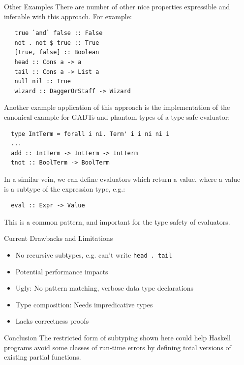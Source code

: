 \documentclass[final]{beamer}
\begin{document}
\begin{frame}[fragile]
\begin{columns}
\begin{column}{.33\textwidth}
\end{column}

\begin{column}{.285\textwidth}
\begin{block}{Other Examples}
\vspace{0.5cm}
There are number of other nice properties expressible and inferable with this
approach. For example:

\begin{verbatim}
   true `and` false :: False
   not . not $ true :: True
   [true, false] :: Boolean
   head :: Cons a -> a
   tail :: Cons a -> List a
   null nil :: True
   wizard :: DaggerOrStaff -> Wizard
\end{verbatim}

Another example application of this approach is the implementation of the
canonical example for GADTs and phantom types of a type-safe evaluator:

\begin{verbatim}
  type IntTerm = forall i ni. Term' i i ni ni i
  ...
  add :: IntTerm -> IntTerm -> IntTerm
  tnot :: BoolTerm -> BoolTerm 
\end{verbatim}

In a similar vein, we can define evaluators which return a value, where a value
is a subtype of the expression type, e.g.:

\begin{verbatim}
  eval :: Expr -> Value
\end{verbatim}

This is a common pattern, and important for the type safety of evaluators. 

\end{block}
\vspace{2cm}
\begin{block}{Current Drawbacks and Limitations}
\vspace{0.5cm}
\begin{itemize}
\item No recursive subtypes, e.g. can't write \verb!head . tail!
\item Potential performance impacts
\item Ugly: No pattern matching, verbose data type declarations 
\item Type composition: Needs impredicative types
\item Lacks correctness proofs
\end{itemize}
\vspace{2cm}
\end{block}

\begin{block}{Conclusion}
\vspace{0.5cm}
The restricted form of subtyping shown here could help Haskell programs avoid
some classes of run-time errors by defining total versions of existing partial
functions. 
\end{block}
\end{column}
\end{columns}
\end{frame}
\end{document}
